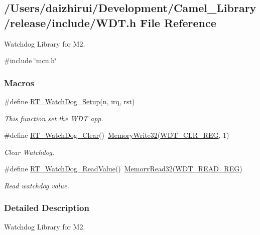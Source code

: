 \hypertarget{a00059}{}\subsection{/\+Users/daizhirui/\+Development/\+Camel\+\_\+\+Library/release/include/\+W\+DT.h File Reference}
\label{a00059}


Watchdog Library for M2.  


{\ttfamily \#include \char`\"{}mcu.\+h\char`\"{}}\newline
\subsubsection*{Macros}
\begin{DoxyCompactItemize}
\item 
\#define \mbox{\hyperlink{a00059_a369b51538a0ccf57dcdb30e12352a8c7}{R\+T\+\_\+\+Watch\+Dog\+\_\+\+Setup}}(n,  irq,  rst)
\begin{DoxyCompactList}\small\item\em This function set the W\+DT app. \end{DoxyCompactList}\item 
\#define \mbox{\hyperlink{a00059_ae976b2fe76d4b216e68a771068434abc}{R\+T\+\_\+\+Watch\+Dog\+\_\+\+Clear}}()~\mbox{\hyperlink{a00020_a6b9732365b12e48ddb89fe1028b975b0}{Memory\+Write32}}(\mbox{\hyperlink{a00020_adadaa0ab1ebbd7ba9b70dfd24c3ed44dabca167e95871e42fa1108c2fd2cae6b3}{W\+D\+T\+\_\+\+C\+L\+R\+\_\+\+R\+EG}}, 1)
\begin{DoxyCompactList}\small\item\em Clear Watchdog. \end{DoxyCompactList}\item 
\#define \mbox{\hyperlink{a00059_acdfc8b8f0bddfd7382d49a22a92a5930}{R\+T\+\_\+\+Watch\+Dog\+\_\+\+Read\+Value}}()~\mbox{\hyperlink{a00020_a2d484dc15bdf30ee11ab3b05f31f0e16}{Memory\+Read32}}(\mbox{\hyperlink{a00020_adadaa0ab1ebbd7ba9b70dfd24c3ed44da91e0f7299a076e5fae19c026a579e1bb}{W\+D\+T\+\_\+\+R\+E\+A\+D\+\_\+\+R\+EG}})
\begin{DoxyCompactList}\small\item\em Read watchdog value. \end{DoxyCompactList}\end{DoxyCompactItemize}


\subsubsection{Detailed Description}
Watchdog Library for M2. 

